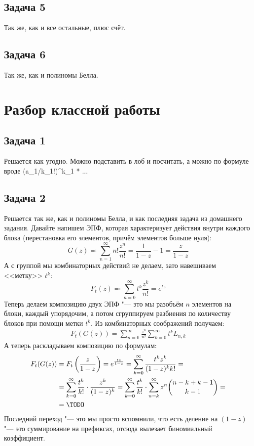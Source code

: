 \subsection{Задача 5}
	Так же, как и все остальные, плюс счёт.

\subsection{Задача 6}
	Так же, как и полиномы Белла.

\section{Разбор классной работы}
\subsection{Задача 1}
	Решается как угодно.
	Можно подставить в лоб и посчитать, а можно по формуле вроде (a_1/k_1!)^{k_1} * ...

\subsection{Задача 2}
	Решается так же, как и полиномы Белла, и как последняя задача из домашнего задания.
	Давайте напишем ЭПФ, которая характеризует действия внутри каждого блока (перестановка его элементов,
	причём элементов больше нуля):
	\[ G(z) \eqcolon \sum_{n=1}^\infty n! \frac{z^n}{n!} = \frac{1}{1-z} - 1 = \frac{z}{1-z} \]
	А с группой мы комбинаторных действий не делаем, зато навешиваем <<метку>> $t^k$:
	\[ F_t(z) \eqcolon \sum_{n=0}^\infty t^k\frac{z^k}{n!} = e^{tz} \]
	Теперь делаем композицию двух ЭПФ "--- это мы разобъём $n$ элементов на блоки,
	каждый упорядочим, а потом сгруппируем разбиения по количеству блоков при помощи метки $t^k$.
	Из комбинаторных соображений получаем:
	\begin{gather*}
		F_t(G(z)) = \sum_{n=0}^{\infty} \frac{z^n}{n!} \sum_{k=0}^\infty t^k L_{n, k}
	\end{gather*}
	А теперь раскладываем композицию по формулам:
	\begin{align*}
		F_t(G(z)) &=
			F_t\left(\frac{z}{1-z}\right) =
			e^{\frac{tz}{1-z}} =
			\sum_{k=0}^\infty \frac{t^kz^k}{(1-z)^kk!} = \\
			&= \sum_{k=0}^\infty \frac{t^k}{k!} \cdot \frac{z^k}{(1-z)^k} =
			\sum_{k=0}^\infty \frac{t^k}{k!} \cdot \sum_{n=k}^\infty z^n \binom{n-k+k-1}{k-1} = \\
			&= \TODO
	\end{align*}
	Последний переход "--- это мы просто вспомнили, что есть деление на $(1-z)$ "--- это
	суммирование на префиксах, отсюда вылезает биномиальный коэффициент.

